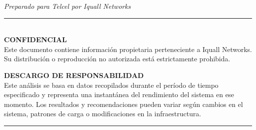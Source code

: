 \documentclass[11pt,a4paper]{article}
\newcommand{\TemporalRangeDays}[1]{%
  \begingroup
    \AdvanceDate[-#1]%
    \the\day\ de \ifcase\month\or enero\or febrero\or marzo\or abril\or mayo\or junio\or julio\or agosto\or septiembre\or octubre\or noviembre\or diciembre\fi\ de \the\year\space-\\[0pt]
    \AdvanceDate[#1]%
    \the\day\ de \ifcase\month\or enero\or febrero\or marzo\or abril\or mayo\or junio\or julio\or agosto\or septiembre\or octubre\or noviembre\or diciembre\fi\ de \the\year
  \endgroup
}
\begin{document}
\begin{titlepage}
    \vspace{0.9cm}

    \begin{flushright}
    \end{flushright}

    \vfill
    \vspace{0.35cm}

    \begin{center}
        {\small \textit{Preparado para Telcel por Iquall Networks}}
    \end{center}
\end{titlepage}

\newpage
\thispagestyle{empty}
\vspace*{5cm}
\begin{minipage}{\textwidth}
\centering
\rule{\textwidth}{0.4pt} \\
\vspace{0.3cm}
\textbf{CONFIDENCIAL} \\
Este documento contiene información propietaria perteneciente a Iquall Networks. \\
Su distribución o reproducción no autorizada está estrictamente prohibida. \\

\vspace{0.5cm}

\textbf{DESCARGO DE RESPONSABILIDAD} \\
Este análisis se basa en datos recopilados durante el período de tiempo especificado y representa una instantánea del rendimiento del sistema en ese momento. Los resultados y recomendaciones pueden variar según cambios en el sistema, patrones de carga o modificaciones en la infraestructura. \\

\vspace{0.3cm}
\rule{\textwidth}{0.4pt}
\end{minipage}
\newpage
\end{document}
